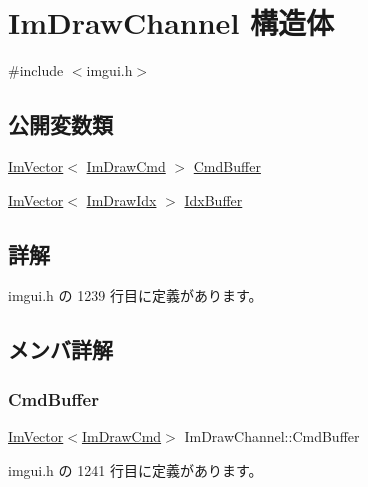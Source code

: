 \hypertarget{struct_im_draw_channel}{}\section{Im\+Draw\+Channel 構造体}
\label{struct_im_draw_channel}


{\ttfamily \#include $<$imgui.\+h$>$}

\subsection*{公開変数類}
\begin{DoxyCompactItemize}
\item 
\mbox{\hyperlink{class_im_vector}{Im\+Vector}}$<$ \mbox{\hyperlink{struct_im_draw_cmd}{Im\+Draw\+Cmd}} $>$ \mbox{\hyperlink{struct_im_draw_channel_abdaa17053d55fb6757c1971d410ceddf}{Cmd\+Buffer}}
\item 
\mbox{\hyperlink{class_im_vector}{Im\+Vector}}$<$ \mbox{\hyperlink{imgui_8h_afdc8744a5ac1a968b1ddfa47e13b2fa1}{Im\+Draw\+Idx}} $>$ \mbox{\hyperlink{struct_im_draw_channel_a7fbed7d3523124fadd94859d5ac0fd67}{Idx\+Buffer}}
\end{DoxyCompactItemize}


\subsection{詳解}


 imgui.\+h の 1239 行目に定義があります。



\subsection{メンバ詳解}
\mbox{\label{struct_im_draw_channel_abdaa17053d55fb6757c1971d410ceddf}} 
\subsubsection{\texorpdfstring{Cmd\+Buffer}{CmdBuffer}}
{\footnotesize\ttfamily \mbox{\hyperlink{class_im_vector}{Im\+Vector}}$<$\mbox{\hyperlink{struct_im_draw_cmd}{Im\+Draw\+Cmd}}$>$ Im\+Draw\+Channel\+::\+Cmd\+Buffer}



 imgui.\+h の 1241 行目に定義があります。


